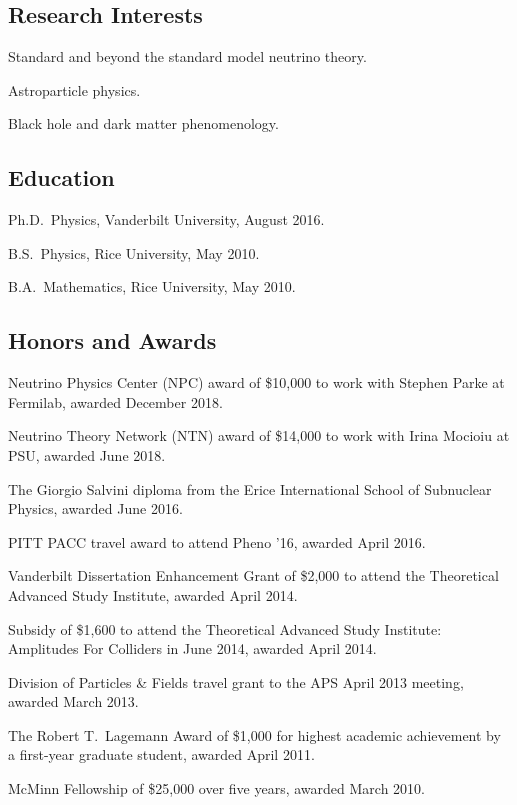 \documentclass{article}
\renewenvironment{itemize}{
\begin{list}{}{
\setlength{\leftmargin}{.5em}}}{
\end{list}}
\begin{document}
\subsection*{Research Interests}
\begin{itemize}
\item Standard and beyond the standard model neutrino theory.
\item Astroparticle physics.
\item Black hole and dark matter phenomenology.
\end{itemize}

\subsection*{Education}
\begin{itemize}
\item Ph.D.~Physics, Vanderbilt University, August 2016.
\item B.S.~Physics, Rice University, May 2010.
\item B.A.~Mathematics, Rice University, May 2010.
\end{itemize}

\subsection*{Honors and Awards}
\begin{itemize}
\item Neutrino Physics Center (NPC) award of \$10,000 to work with Stephen Parke at Fermilab, awarded December 2018.
\item Neutrino Theory Network (NTN) award of \$14,000 to work with Irina Mocioiu at PSU, awarded June 2018.
\item The Giorgio Salvini diploma from the Erice International School of Subnuclear Physics, awarded June 2016.
\item PITT PACC travel award to attend Pheno '16, awarded April 2016.
\item Vanderbilt Dissertation Enhancement Grant of \$2,000 to attend the Theoretical Advanced Study Institute, awarded April 2014.
\item Subsidy of \$1,600 to attend the Theoretical Advanced Study Institute: Amplitudes For Colliders in June 2014, awarded April 2014.
\item Division of Particles \& Fields travel grant to the APS April 2013 meeting, awarded March 2013.
\item The Robert T.~Lagemann Award of \$1,000 for highest academic achievement by a first-year graduate student, awarded April 2011.
\item McMinn Fellowship of \$25,000 over five years, awarded March 2010.
\end{itemize}
\end{document}
